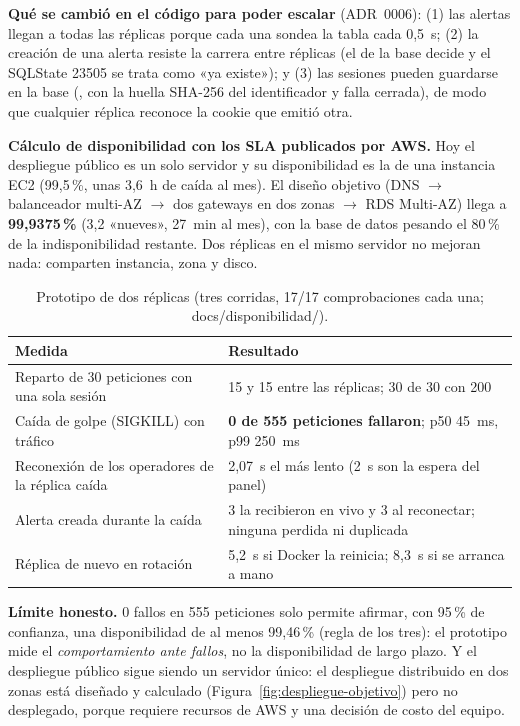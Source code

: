 \textbf{Qué se cambió en el código para poder escalar} (ADR~0006): (1) las alertas llegan a todas las réplicas porque cada una sondea la tabla
cada 0,5~s; (2) la creación de una alerta resiste la carrera entre réplicas (el  de la base decide y el SQLState 23505 se trata como
«ya existe»); y (3) las sesiones pueden guardarse en la base (, con la huella SHA-256 del identificador y
falla cerrada), de modo que cualquier réplica reconoce la cookie que emitió otra.

\textbf{Cálculo de disponibilidad con los SLA publicados por AWS.} Hoy el despliegue público es un solo servidor y su disponibilidad es la de
una instancia EC2 (99,5\,\%, unas 3,6~h de caída al mes). El diseño objetivo (DNS $\rightarrow$ balanceador multi-AZ $\rightarrow$ dos gateways en
dos zonas $\rightarrow$ RDS Multi-AZ) llega a \textbf{99,9375\,\%} (3,2 «nueves», 27~min al mes), con la base de datos pesando el 80\,\% de la
indisponibilidad restante. Dos réplicas en el mismo servidor no mejoran nada: comparten instancia, zona y disco.

\begin{table}[H]
\centering\small
\caption{Prototipo de dos réplicas (tres corridas, 17/17 comprobaciones cada una; docs/disponibilidad/).}\label{tab:escalado}
\begin{tabularx}{\textwidth}{lY}
\toprule
\textbf{Medida} & \textbf{Resultado} \\
\midrule
Reparto de 30 peticiones con una sola sesión & 15 y 15 entre las réplicas; 30 de 30 con 200 \\
Caída de golpe (SIGKILL) con tráfico & \textbf{0 de 555 peticiones fallaron}; p50 45~ms, p99 250~ms \\
Reconexión de los operadores de la réplica caída & 2,07~s el más lento (2~s son la espera del panel) \\
Alerta creada durante la caída & 3 la recibieron en vivo y 3 al reconectar; ninguna perdida ni duplicada \\
Réplica de nuevo en rotación & 5,2~s si Docker la reinicia; 8,3~s si se arranca a mano \\
\bottomrule
\end{tabularx}
\end{table}

\textbf{Límite honesto.} 0 fallos en 555 peticiones solo permite afirmar, con 95\,\% de confianza, una disponibilidad de al menos 99,46\,\%
(regla de los tres): el prototipo mide el \emph{comportamiento ante fallos}, no la disponibilidad de largo plazo. Y el despliegue público sigue
siendo un servidor único: el despliegue distribuido en dos zonas está diseñado y calculado (Figura~\ref{fig:despliegue-objetivo}) pero no
desplegado, porque requiere recursos de AWS y una decisión de costo del equipo.

